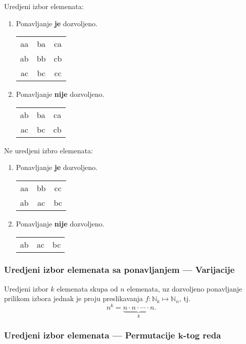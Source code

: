 \documentclass[12p, a4paper]{article}
\begin{document}
\begin{multicols}{2}
    Uredjeni izbor elemenata:
    \begin{enumerate}
        \item Ponavljanje \textbf{je} dozvoljeno.
            \begin{tabular}{*{3}{c}}
                aa & ba &ca \\
                ab & bb &cb \\
                ac & bc &cc \\
            \end{tabular}
        \item Ponavljanje \textbf{nije} dozvoljeno.
            \begin{tabular}{*{3}{c}}
                ab & ba &ca \\
                ac & bc &cb \\
            \end{tabular}
    \end{enumerate}

    Ne uredjeni izbro elemenata:
    \begin{enumerate}
        \item Ponavljanje \textbf{je} dozvoljeno.
            \begin{tabular}{*{3}{c}}
                aa & bb & cc \\
                ab & ac & bc \\
            \end{tabular}
        \item Ponavljanje \textbf{nije} dozvoljeno.
            \begin{tabular}{*{3}{c}}
                ab & ac & bc \\
            \end{tabular}
    \end{enumerate}

    \subsubsection{Uredjeni izbor elemenata sa ponavljanjem --- Varijacije}

    Uredjeni izbor $k$ elemenata skupa od $n$ elemenata, uz dozvoljeno 
    ponavljanje prilikom izbora jednak je proju preslikavanja 
    $f: \mathbb{N}_k \mapsto \mathbb{N}_n$, tj.\
    \[
        n^k = \underbrace{n \cdot n \cdot \cdots \cdot n}_k.
    \]

    \subsubsection{Uredjeni izbor elemenata --- 
    Permutacije $\mathbf{k}$-tog reda}


\end{multicols}
\end{document}
